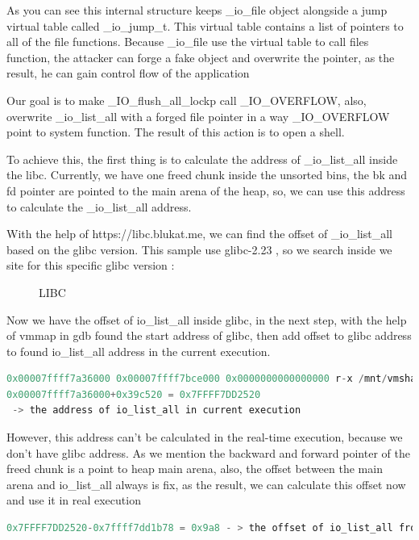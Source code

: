 \documentclass{masterthesis}
\newcommand*\libc{glibc}
\newcommand*\ub{unsorted bins}
\begin{document}
As you can see this internal structure keeps \_io\_file object alongside a jump virtual table called \_io\_jump\_t. This virtual table contains a list of pointers to all of the file functions. Because \_io\_file use the virtual table to call files function, the attacker can forge a fake object and overwrite the pointer, as the result, he can gain control flow of the application

Our goal is to make \_IO\_flush\_all\_lockp call \_IO\_OVERFLOW, also, overwrite \_io\_list\_all with a forged file pointer in a way \_IO\_OVERFLOW point to system function. The result of this action is to open a shell.

To achieve this, the first thing is to calculate the address of \_io\_list\_all inside the libc. Currently, we have one freed chunk inside the \ub{}, the bk and fd pointer are pointed to the main arena of the heap, so, we can use this address to calculate the \_io\_list\_all address. 

With the help of https://libc.blukat.me, we can find the offset of \_io\_list\_all based on the \libc{} version. This sample use \libc{-2.23} , so we search inside we site for this specific \libc{} version :

\begin{figure}[h!]
  \caption{LIBC}
\end{figure}


Now we have the offset of io\_list\_all inside \libc{}, in the next step, with the help of vmmap in gdb found the start address of \libc{}, then add offset to \libc{} address to found io\_list\_all address in the current execution.
\begin{lstlisting}[language=c,frame=tlrb]
0x00007ffff7a36000 0x00007ffff7bce000 0x0000000000000000 r-x /mnt/vmshare/MasterThesis/libc223/libc.so.6
0x00007ffff7a36000+0x39c520 = 0x7FFFF7DD2520
 -> the address of io_list_all in current execution
\end{lstlisting}



However, this address can’t be calculated in the real-time execution, because we don’t have \libc{} address. As we mention the backward and forward pointer of the freed chunk is a point to heap main arena, also, the offset between the main arena and io\_list\_all always is fix, as the result, we can calculate this offset now and use it in real execution 
\begin{lstlisting}[language=c,frame=tlrb]
0x7FFFF7DD2520-0x7ffff7dd1b78 = 0x9a8 - > the offset of io_list_all from main arena
\end{lstlisting}
\end{document}
